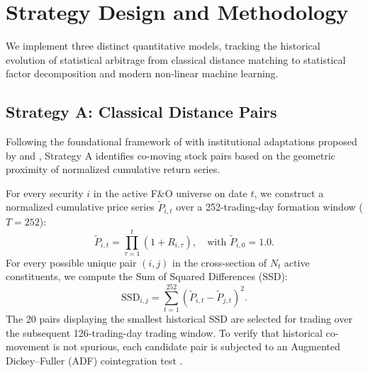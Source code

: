 \documentclass[11pt,a4paper]{article}
\begin{document}
\section{Strategy Design and Methodology}
\label{sec:methodology}

We implement three distinct quantitative models, tracking the historical evolution of statistical arbitrage from classical distance matching to statistical factor decomposition and modern non-linear machine learning.

\subsection{Strategy A: Classical Distance Pairs}
Following the foundational framework of \citet{gatev2006pairs} with institutional adaptations proposed by \citet{vidyamurthy2004pairs} and \citet{jacobs2015determinants}, Strategy A identifies co-moving stock pairs based on the geometric proximity of normalized cumulative return series.

For every security $i$ in the active F\&O universe on date $t$, we construct a normalized cumulative price series $\tilde{P}_{i,t}$ over a 252-trading-day formation window ($T=252$):
\begin{equation}
    \tilde{P}_{i,t} = \prod_{\tau=1}^t (1 + R_{i,\tau}), \quad \text{with } \tilde{P}_{i,0} = 1.0.
    \label{eq:norm_price}
\end{equation}
For every possible unique pair $(i, j)$ in the cross-section of $N_t$ active constituents, we compute the Sum of Squared Differences (SSD):
\begin{equation}
    \text{SSD}_{i,j} = \sum_{t=1}^{252} \left( \tilde{P}_{i,t} - \tilde{P}_{j,t} \right)^2.
    \label{eq:ssd}
\end{equation}
The 20 pairs displaying the smallest historical SSD are selected for trading over the subsequent 126-trading-day trading window. To verify that historical co-movement is not spurious, each candidate pair is subjected to an Augmented Dickey--Fuller (ADF) cointegration test \citep{engle1987cointegration}.
\end{document}

